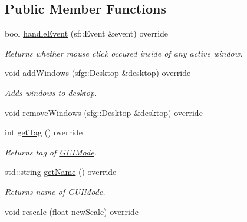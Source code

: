 \subsection*{Public Member Functions}
\begin{DoxyCompactItemize}
\item 
\hypertarget{classGUIModeMiner_af36ccd84103f5e0ce83498069612a38f}{bool \hyperlink{classGUIModeMiner_af36ccd84103f5e0ce83498069612a38f}{handle\-Event} (sf\-::\-Event \&event) override}\label{classGUIModeMiner_af36ccd84103f5e0ce83498069612a38f}

\begin{DoxyCompactList}\small\item\em Returns whether mouse click occured inside of any active window. \end{DoxyCompactList}\item 
\hypertarget{classGUIModeMiner_a0a6833450b35219d01d95e7586579d95}{void \hyperlink{classGUIModeMiner_a0a6833450b35219d01d95e7586579d95}{add\-Windows} (sfg\-::\-Desktop \&desktop) override}\label{classGUIModeMiner_a0a6833450b35219d01d95e7586579d95}

\begin{DoxyCompactList}\small\item\em Adds windows to desktop. \end{DoxyCompactList}\item 
void \hyperlink{classGUIModeMiner_ac494c734e0e209548f7749edd8dfe4b3}{remove\-Windows} (sfg\-::\-Desktop \&desktop) override
\item 
\hypertarget{classGUIModeMiner_a78c53490f8f9ddeb6b5412a93c90d4f3}{int \hyperlink{classGUIModeMiner_a78c53490f8f9ddeb6b5412a93c90d4f3}{get\-Tag} () override}\label{classGUIModeMiner_a78c53490f8f9ddeb6b5412a93c90d4f3}

\begin{DoxyCompactList}\small\item\em Returns tag of \hyperlink{classGUIMode}{G\-U\-I\-Mode}. \end{DoxyCompactList}\item 
\hypertarget{classGUIModeMiner_a391b51f1090c5779716caa52dca00a88}{std\-::string \hyperlink{classGUIModeMiner_a391b51f1090c5779716caa52dca00a88}{get\-Name} () override}\label{classGUIModeMiner_a391b51f1090c5779716caa52dca00a88}

\begin{DoxyCompactList}\small\item\em Returns name of \hyperlink{classGUIMode}{G\-U\-I\-Mode}. \end{DoxyCompactList}\item 
\hypertarget{classGUIModeMiner_adcfcea6c9e1c660f6d9d2ca991462079}{void \hyperlink{classGUIModeMiner_adcfcea6c9e1c660f6d9d2ca991462079}{rescale} (float new\-Scale) override}\label{classGUIModeMiner_adcfcea6c9e1c660f6d9d2ca991462079}


\end{DoxyCompactItemize}
